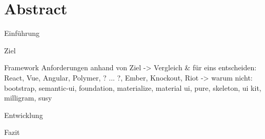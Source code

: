 \chapter{Abstract}

Einführung
 
Ziel

Framework
    Anforderungen anhand von Ziel
        -> Vergleich & für eins entscheiden: React, Vue, Angular, Polymer, ? ... ?, Ember, Knockout, Riot
        -> warum nicht: bootstrap, semantic-ui, foundation, materialize, material ui, pure, skeleton, ui kit, milligram, susy
    
Entwicklung


Fazit